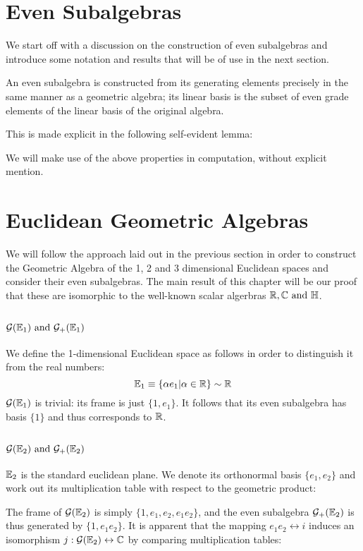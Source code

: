 \section{Even Subalgebras}
We start off with a discussion on the construction of even subalgebras and introduce some notation and results that will be of use in the next section.

An even subalgebra is constructed from its generating elements precisely in the same manner as a geometric algebra; its linear basis is the subset of even grade elements of the linear basis of the original algebra.

This is made explicit in the following self-evident lemma:

We will make use of the above properties in computation, without explicit mention.



\section{Euclidean Geometric Algebras}
We will follow the approach laid out in the previous section in order to construct the Geometric Algebra of the 1, 2 and 3 dimensional Euclidean spaces and consider their even subalgebras.
The main result of this chapter will be our proof that these are isomorphic to the well-known scalar algerbras $\R, \C \mathrm{\ and\ } \HM$.

\subsection{$\G(\E_1)\ \mathrm{and}\ \G_+(\E_1)$}

We define the 1-dimensional Euclidean space as follows in order to distinguish it from the real numbers:
\[\mathbb{E}_1 \equiv \{\alpha e_1 | \alpha \in \mathbb{R}\} \sim \mathbb{R}\]
$\mathcal{G}(\mathbb{E}_1)$  is trivial: its frame is just $\{1, e_1\}$.
It follows that its even subalgebra has basis $\{1\}$ and thus corresponds to $\mathbb{R}$.

\subsection{$\G(\E_2)\ \mathrm{and}\ \G_+(\E_2)$}

$\mathbb{E}_2$ is the standard euclidean plane. We denote its orthonormal basis $\{e_1, e_2\}$ and work out its multiplication table with respect to the geometric product:


The frame of $\mathcal{G}(\mathbb{E}_2)$ is simply $\{1, e_1, e_2, e_1e_2\}$, and the even subalgebra $\mathcal{G}_+(\mathbb{E}_2)$ is thus generated by $\{1, e_1e_2 \}$.
It is apparent that the mapping $e_1e_2 \leftrightarrow i$ induces an isomorphism $j : \mathcal{G}(\mathbb{E}_2) \leftrightarrow \mathbb{C}$ by comparing multiplication tables:


